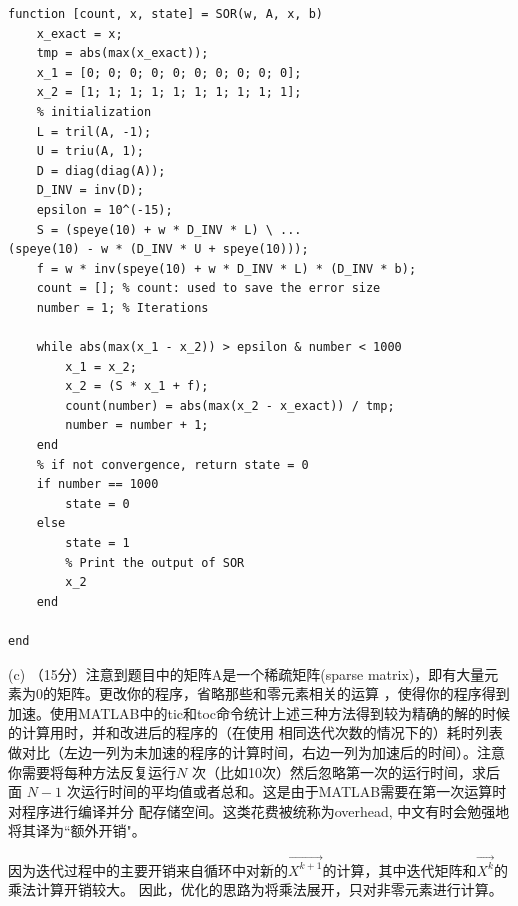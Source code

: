 \documentclass[12pt,a4paper,UTF8]{ctexart}
\begin{document}
\begin{enumerate}
\begin{lstlisting}[frame=single]
function [count, x, state] = SOR(w, A, x, b)
    x_exact = x;
    tmp = abs(max(x_exact));
    x_1 = [0; 0; 0; 0; 0; 0; 0; 0; 0; 0];
    x_2 = [1; 1; 1; 1; 1; 1; 1; 1; 1; 1];
    % initialization
    L = tril(A, -1);
    U = triu(A, 1);
    D = diag(diag(A));
    D_INV = inv(D);
    epsilon = 10^(-15);
    S = (speye(10) + w * D_INV * L) \ ...
(speye(10) - w * (D_INV * U + speye(10)));
    f = w * inv(speye(10) + w * D_INV * L) * (D_INV * b);
    count = []; % count: used to save the error size
    number = 1; % Iterations

    while abs(max(x_1 - x_2)) > epsilon & number < 1000
        x_1 = x_2;
        x_2 = (S * x_1 + f);
        count(number) = abs(max(x_2 - x_exact)) / tmp;
        number = number + 1;
    end
    % if not convergence, return state = 0
    if number == 1000
        state = 0
    else
        state = 1
        % Print the output of SOR 
        x_2
    end

end
         \end{lstlisting}
          (c) （15分）注意到题目中的矩阵A是一个稀疏矩阵(sparse matrix)，即有大量元素为0的矩阵。更改你的程序，省略那些和零元素相关的运算
          ，使得你的程序得到加速。使用MATLAB中的tic和toc命令统计上述三种方法得到较为精确的解的时候的计算用时，并和改进后的程序的（在使用
          相同迭代次数的情况下的）耗时列表做对比（左边一列为未加速的程序的计算时间，右边一列为加速后的时间）。注意你需要将每种方法反复运行$N$
          次（比如10次）然后忽略第一次的运行时间，求后面 $N-1$ 次运行时间的平均值或者总和。这是由于MATLAB需要在第一次运算时对程序进行编译并分
          配存储空间。这类花费被统称为overhead, 中文有时会勉强地将其译为“额外开销"。

          因为迭代过程中的主要开销来自循环中对新的$\overrightarrow{X^{k+1}}$的计算，其中迭代矩阵和$\overrightarrow{X^{k}}$的乘法计算开销较大。
          因此，优化的思路为将乘法展开，只对非零元素进行计算。


\end{enumerate}
\end{document}
